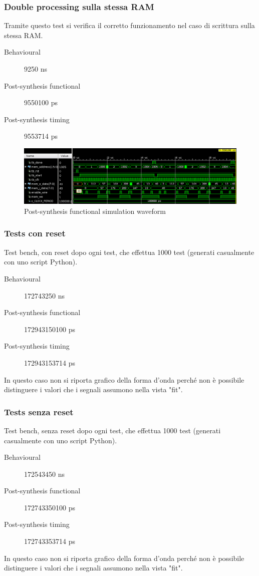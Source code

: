 \documentclass{article}
\begin{document}
\subsubsection{Double processing sulla stessa RAM}
Tramite questo test si verifica il corretto funzionamento nel caso di scrittura sulla stessa RAM.
\begin{description}
	\item[Behavioural] 9250 ns
	\item[Post-synthesis functional] 9550100 ps
	\item[Post-synthesis timing] 9553714 ps
\end{description}
\begin{figure}[H]
	\centering
	\includegraphics[width=1\textwidth]{Assets/tb5.png}
	\caption{Post-synthesis functional simulation waveform}
\end{figure}

\subsubsection{Tests con reset}
Test bench, con reset dopo ogni test, che effettua 1000 test (generati casualmente con uno script Python).
\begin{description}
	\item[Behavioural] 172743250 ns
	\item[Post-synthesis functional] 172943150100 ps
	\item[Post-synthesis timing] 172943153714 ps
\end{description}
In questo caso non si riporta grafico della forma d'onda perché non è possibile distinguere i valori che i segnali assumono nella vista "fit".

\subsubsection{Tests senza reset}
Test bench, senza reset dopo ogni test, che effettua 1000 test (generati casualmente con uno script Python).
\begin{description}
	\item[Behavioural] 172543450 ns
	\item[Post-synthesis functional] 172743350100 ps
	\item[Post-synthesis timing] 172743353714 ps
\end{description}
In questo caso non si riporta grafico della forma d'onda perché non è possibile distinguere i valori che i segnali assumono nella vista "fit".
\end{document}
